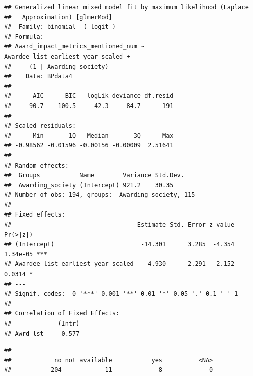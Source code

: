\documentclass[
]{article}
\newenvironment{Shaded}{\begin{snugshade}}{\end{snugshade}}
\newcommand{\AttributeTok}[1]{\textcolor[rgb]{0.77,0.63,0.00}{#1}}
\newcommand{\CommentTok}[1]{\textcolor[rgb]{0.56,0.35,0.01}{\textit{#1}}}
\newcommand{\DocumentationTok}[1]{\textcolor[rgb]{0.56,0.35,0.01}{\textbf{\textit{#1}}}}
\newcommand{\FunctionTok}[1]{\textcolor[rgb]{0.00,0.00,0.00}{#1}}
\newcommand{\NormalTok}[1]{#1}
\newcommand{\SpecialCharTok}[1]{\textcolor[rgb]{0.00,0.00,0.00}{#1}}
\newcommand{\StringTok}[1]{\textcolor[rgb]{0.31,0.60,0.02}{#1}}
\begin{document}
\begin{verbatim}
## Generalized linear mixed model fit by maximum likelihood (Laplace
##   Approximation) [glmerMod]
##  Family: binomial  ( logit )
## Formula: 
## Award_impact_metrics_mentioned_num ~ Awardee_list_earliest_year_scaled +  
##     (1 | Awarding_society)
##    Data: BPdata4
## 
##      AIC      BIC   logLik deviance df.resid 
##     90.7    100.5    -42.3     84.7      191 
## 
## Scaled residuals: 
##      Min       1Q   Median       3Q      Max 
## -0.98562 -0.01596 -0.00156 -0.00009  2.51641 
## 
## Random effects:
##  Groups           Name        Variance Std.Dev.
##  Awarding_society (Intercept) 921.2    30.35   
## Number of obs: 194, groups:  Awarding_society, 115
## 
## Fixed effects:
##                                   Estimate Std. Error z value Pr(>|z|)    
## (Intercept)                        -14.301      3.285  -4.354 1.34e-05 ***
## Awardee_list_earliest_year_scaled    4.930      2.291   2.152   0.0314 *  
## ---
## Signif. codes:  0 '***' 0.001 '**' 0.01 '*' 0.05 '.' 0.1 ' ' 1
## 
## Correlation of Fixed Effects:
##             (Intr)
## Awrd_lst___ -0.577
\end{verbatim}

\begin{Shaded}
\end{Shaded}

\begin{verbatim}
## 
##            no not available           yes          <NA> 
##           204            11             8             0
\end{verbatim}
\end{document}
